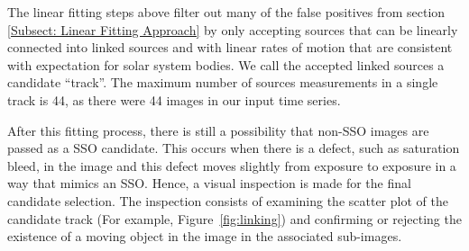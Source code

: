 \documentclass{aastex631}
\begin{document}

The linear fitting steps above filter out many of the false positives from section \ref{Subsect: Linear Fitting Approach} by only accepting sources that can be linearly connected into linked sources and with linear rates of motion that are consistent with expectation for solar system bodies.
We call the accepted linked sources a candidate ``track''. 
The maximum number of sources measurements in a single track is 44, as there were 44 images in our input time series.



After this fitting process, there is still a possibility that non-SSO images are passed as a SSO candidate.
This occurs when there is a defect, such as saturation bleed, in the image and this defect moves slightly from exposure to exposure in a way that mimics an SSO.
Hence, a visual inspection is made for the final candidate selection.
The inspection consists of examining the scatter plot of the candidate track (For example, Figure~\ref{fig:linking}) and confirming or rejecting the existence of a moving object in the image in the associated sub-images.
\end{document}
